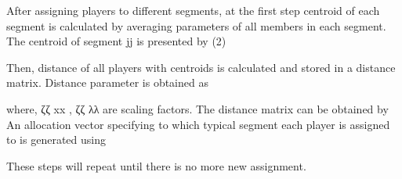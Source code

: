 \documentclass{scrartcl}
\begin{document}
After assigning players to different segments, at the first
step centroid of each segment is calculated by averaging parameters of all members in each segment. The centroid
of segment jj is presented by (2)

Then, distance of all players with centroids is calculated
and stored in a distance matrix. Distance parameter is
obtained as

where, ζζ xx , ζζ λλ are scaling factors. The distance matrix can
be obtained by
An allocation vector specifying to which typical segment
each player is assigned to is generated using

These steps will repeat until there is no more new
assignment.

\end{document}
